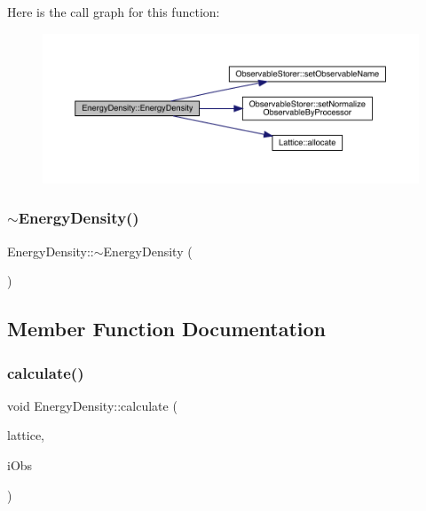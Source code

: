 Here is the call graph for this function\+:\nopagebreak
\begin{figure}[H]
\begin{center}
\leavevmode
\includegraphics[width=350pt]{class_energy_density_a1d23cfe5690c9daf8b2f0ec8f6471c5f_cgraph}
\end{center}
\end{figure}
\mbox{\label{class_energy_density_a307e031858ac7149f5689911f8ff22fb}} 
\subsubsection{\texorpdfstring{$\sim$EnergyDensity()}{~EnergyDensity()}}
{\footnotesize\ttfamily Energy\+Density\+::$\sim$\+Energy\+Density (\begin{DoxyParamCaption}{ }\end{DoxyParamCaption})}



\subsection{Member Function Documentation}
\mbox{\label{class_energy_density_ae8e5e29257104d881bcabeadc3b2c9e7}} 
\subsubsection{\texorpdfstring{calculate()}{calculate()}}
{\footnotesize\ttfamily void Energy\+Density\+::calculate (\begin{DoxyParamCaption}\item[{\mbox{\hyperlink{class_lattice}{Lattice}}$<$ \mbox{\hyperlink{class_s_u3}{S\+U3}} $>$ $\ast$}]{lattice,  }\item[{unsigned int}]{i\+Obs }\end{DoxyParamCaption})\hspace{0.3cm}{\ttfamily [virtual]}}




